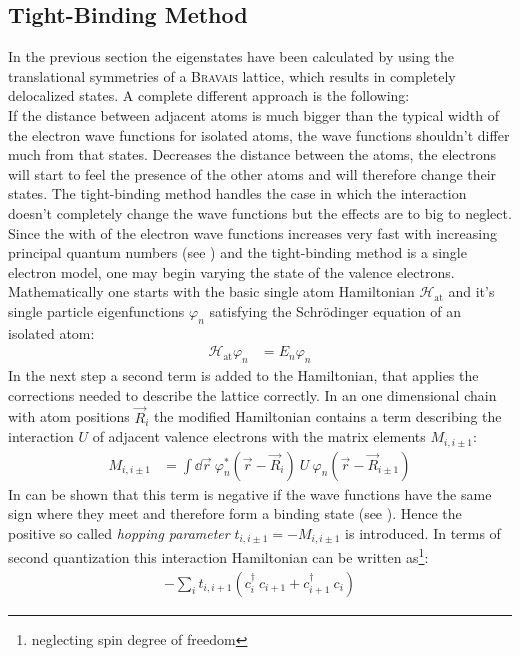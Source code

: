 \subsection{Tight-Binding Method}
In the previous section the eigenstates have been calculated by using the translational symmetries of a \textsc{Bravais} lattice, which results in completely delocalized states. A complete different approach is the following:\\
If the distance between adjacent atoms is much bigger than the typical width of the electron wave functions for isolated atoms, the wave functions shouldn't differ much from that states. Decreases the distance between the atoms, the electrons will start to feel the presence of the other atoms and will therefore change their states. The tight-binding method handles the case in which the interaction doesn't completely change the wave functions but the effects are to big to neglect. Since the with of the electron wave functions increases very fast with increasing principal quantum numbers (see \cite{landau}) and the tight-binding method is a single electron model, one may begin varying the state of the valence electrons.\\
Mathematically one starts with the basic single atom Hamiltonian $\mathcal{H}_{\text{at}}$ and it's single particle eigenfunctions $\varphi_n$ satisfying the Schrödinger equation of an isolated atom:
\begin{align}
	\mathcal{H}_{\text{at}} \varphi_n &= E_n \varphi_n
\end{align}
In the next step a second term is added to the Hamiltonian, that applies the corrections needed to describe the lattice correctly. In an one dimensional chain with atom positions $\vec{R}_i$ the modified Hamiltonian contains a term describing the interaction $U$ of adjacent valence electrons with the matrix elements $M_{i, i\pm1}$:
\begin{align}
	M_{i, i\pm1} &= \int\dd\vec{r}\ \varphi_n^*\left(\vec{r} - \vec{R}_i\right)\ U\ \varphi_n\left(\vec{r}-\vec{R}_{i\pm1}\right) 
\end{align}
In can be shown that this term is negative if the wave functions have the same sign where they meet and therefore form a binding state (see \cite{rohrer}). Hence the positive so called \emph{hopping parameter} $t_{i, i\pm 1} = - M_{i, i\pm 1}$ is introduced. In terms of second quantization this interaction Hamiltonian can be written as\footnote{neglecting spin degree of freedom}:
\begin{align}
	- \sum_i t_{i, i+1} \left(c_i^\dagger\  c_{i+1} + c_{i+1}^\dagger\  c_i\right)
\end{align}
